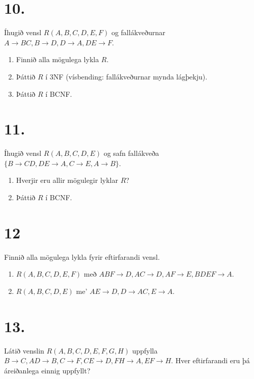 \documentclass{article}
\newcommand{\enum}{\begin{enumerate}[label = \alph*.]}
\begin{document}
\vspace{1cm}

\section{10.}
Íhugið vensl $R(A, B, C, D, E, F)$ og fallákveðurnar
$A \rightarrow BC, B \rightarrow D, D \rightarrow A, DE \rightarrow F$.

\enum
\item  Finnið alla mögulega lykla $R$.
\item  Þáttið $R$ í 3NF (vísbending: fallákveðurnar mynda lágþekju).
\item  Þáttið $R$ í BCNF. 
\end{enumerate}

\vspace{1cm}

\section{11.}
Íhugið vensl $R(A, B, C, D, E)$ og safn fallákveða
$\{B \rightarrow CD, DE \rightarrow A, C \rightarrow E, A \rightarrow B\}$.

\enum
\item Hverjir eru allir mögulegir lyklar $R$?
\item Þáttið $R$ í BCNF.
\end{enumerate}


\vspace{1cm}


\section{12}
Finnið alla mögulega lykla fyrir eftirfarandi vensl.
\enum
\item $R(A,B,C,D,E,F)$ með $ABF \rightarrow D, AC \rightarrow D, AF \rightarrow E, BDEF \rightarrow A$.
\item $R(A,B,C,D,E)$ me' $AE \rightarrow D, D \rightarrow AC, E \rightarrow A$.
\end{enumerate}

\newpage


\section{13.}
Látið venslin $R(A, B, C, D, E, F, G, H)$ uppfylla $B \rightarrow C, AD \rightarrow B, C \rightarrow
F, CE \rightarrow D, FH \rightarrow A, EF \rightarrow H$.
Hver eftirfarandi eru þá áreiðanlega einnig uppfyllt?
\end{document}
